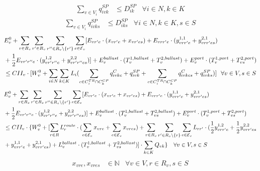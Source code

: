 \documentclass[11pt,english]{article}
\begin{document}
\begin{align}
    \sum_{v \in V_i} q_{ivk}^{SP} &\leq D_{ik}^{SP} & \forall i \in N, k \in K \label{eq:spot-cargo_1}
\end{align}
\begin{align}
    \sum_{v \in V_i} q_{ivks}^{SP} &\leq D_{iks}^{SP} & \forall i \in N, k \in K, s \in S \label{eq:spot-cargo_2}
\end{align}
\begin{align}
    & E_{v}^{0} + \sum_{r \in R_{v}} \sum_{r' \in R_{v}} \sum_{r'' \in R_{v} \setminus \{r'\}} \sum_{e \in \mathcal{E}_v} [E_{vr'e} \cdot (x_{vr'e} + x_{vr'es}) + E_{vrr'e} \cdot (y_{vrr'e}^{1,1} + y_{vrr'es}^{2,1}) \notag \\ & + \frac{1}{2} E_{vr'r''e} \cdot (y_{vr'r''e}^{1,2} + y_{vr'r''es}^{2,2})] + E_{v}^{ballast} \cdot (T_{v}^{1,ballast} + T_{v}^{2,ballast}) + E_{v}^{port} \cdot (T_{v}^{1,port} + T_{vs}^{2,port}) \notag \\ & \leq CII_{v}  \cdot [W_{v}^{0} + \sum_{i \in N} \sum_{k \in K} L_{i} (\sum_{c \in C^{TR}_{i} \cap C^{CP}_k} q^{C}_{ivkc} + q_{ivk}^{SP} + \sum_{c \in C^{TR}_{i} \cap C^{CP}_k} q^{C}_{ivkcs} + q_{ivks}^{SP})] \ \ \forall v \in V, s \in S \label{eq:demand_cii}
\end{align}
\begin{align}
    & E_{v}^{0} + \sum_{r \in R_{v}} \sum_{r' \in R_{v}} \sum_{r'' \in R_{v} \setminus \{r'\}} \sum_{e \in \mathcal{E}_v} [E_{vr'e} \cdot (x_{vr'e} + x_{vr'es}) + E_{vrr'e} \cdot (y_{vrr'e}^{1,1} + y_{vrr'es}^{2,1}) \notag \\ & + \frac{1}{2} E_{vr'r''e} \cdot (y_{vr'r''e}^{1,2} + y_{vr'r''es}^{2,2})] + E_{v}^{ballast} \cdot (T_{v}^{1,ballast} + T_{vs}^{2,ballast}) + E_{v}^{port} \cdot (T_{v}^{1,port} + T_{vs}^{2,port}) \notag \\ & \leq CII_{v}  \cdot \{W_{v}^{0} + [\sum_{r \in R} L_{r}^{route}\cdot (\sum_{e \in \mathcal{E}_v}x_{vre}+ \sum_{e \in \mathcal{E}_v}x_{vres}) + \sum_{r \in R_{v}} \sum_{r' \in R_{v} \setminus \{r\}} \sum_{e \in \mathcal{E}_v} L_{rr'} \cdot (\frac{1}{2} y_{vrr'e}^{1,2} + \frac{1}{2} y_{vrr'es}^{2,2} \notag \\ & + y_{vrr'e}^{1,1} + y_{vrr'es}^{2,1}) + L_{v}^{ballast}\cdot (T_{v}^{1,ballast} + T_{vs}^{2,ballast})]\cdot \sum_{k \in K} Q_{vk}\} \ \ \ \forall v \in V, s \in S \label{eq:supply_cii}
\end{align}
\begin{align}
    x_{vre}, x_{vres} &\in \mathbb{N} & \forall v \in V, r \in R_v, s \in S
\label{eq:variable_1}
\end{align}
\end{document}
